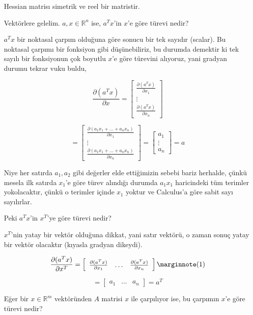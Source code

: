 \documentclass[12pt,fleqn]{article}\usepackage{../../common}
\begin{document}
Hessian matrisı simetrik ve reel bir matristir. 

Vektörlere gelelim. $a,x \in \mathbb{R}^n$ ise, $a^Tx$'in $x$'e göre türevi nedir? 

$a^Tx$ bir noktasal çarpım olduğuna göre sonucu bir tek sayıdır
(scalar). Bu noktasal çarpımı bir fonksiyon gibi düşünebiliriz, bu durumda
demektir ki tek sayılı bir fonksiyonun çok boyutlu $x$'e göre türevini
alıyoruz, yani gradyan durumu tekrar vuku buldu,

$$ 
\frac{\partial (a^Tx)}{\partial x} = 
\left[\begin{array}{c}
\frac{\partial (a^Tx)}{\partial x_1} \\ 
\vdots \\ 
\frac{\partial (a^Tx)}{\partial x_n} 
\end{array}\right] 
 $$

$$  =
\left[\begin{array}{c}
\frac{\partial (a_1x_1 + ... + a_nx_n)}{\partial x_1} \\ 
\vdots \\ 
\frac{\partial (a_1x_1 + ... + a_nx_n)}{\partial x_n} 
\end{array}\right] 
= 
\left[\begin{array}{c}
a_1 \\
\vdots  \\
a_n
\end{array}\right] =
a
 $$

Niye her satırda $a_1,a_2$  gibi değerler elde ettiğimizin sebebi bariz
herhalde, çünkü mesela ilk satırda $x_1$'e göre türev alındığı durumda
$a_1x_1$ haricindeki tüm terimler yokolacaktır, çünkü o terimler içinde
$x_1$ yoktur ve Calculus'a göre sabit sayı sayılırlar.

Peki $a^Tx$'in $x^T$'ye göre türevi nedir? 

$x^T$'nin yatay bir vektör olduğuna dikkat, yani satır vektörü, o zaman
sonuç yatay bir vektör olacaktır (kıyasla gradyan dikeydi).

$$ 
\frac{\partial (a^Tx)}{\partial x^T} = 
\left[\begin{array}{ccc}
\frac{\partial (a^Tx)}{\partial x_1} &
\dots 
&
\frac{\partial (a^Tx)}{\partial x_n} 
\end{array}\right] 
\mlabel{1}
 $$

$$ =
\left[\begin{array}{ccc}
a_1 & \dots & a_n
\end{array}\right] = 
a^T $$

Eğer bir $x \in \mathbb{R}^m$ vektöründen $A$ matrisi $x$ ile çarpılıyor
ise, bu çarpımın $x$'e göre türevi nedir? 
\end{document}

